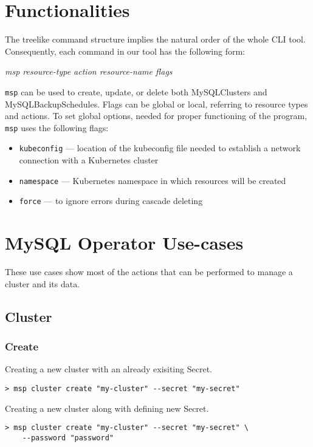 \section{Functionalities}
The treelike command structure implies the natural order of the whole CLI
tool. Consequently, each command in our tool has the following form: \\
\centerline{\textit{msp resource-type action resource-name flags}}
\texttt{msp} can be used to create, update, or delete both MySQLClusters
and MySQLBackupSchedules. Flags can be global or local, referring
to resource types and actions. To set global options, needed for proper
functioning of the program, \texttt{msp} uses the following flags:
\begin{itemize}
    \item \texttt{kubeconfig} --- location of the kubeconfig file needed to
        establish a network connection with a Kubernetes cluster
    \item \texttt{namespace} --- Kubernetes namespace in which resources will be created
    \item \texttt{force} --- to ignore errors during cascade deleting
\end{itemize}


\section{MySQL Operator Use-cases}

These use cases show most of the actions that can be performed to manage a cluster and its data.

\subsection{Cluster}

\subsubsection*{Create}
\noindent Creating a new cluster with an already exisiting Secret.

\begin{lstlisting}
> msp cluster create "my-cluster" --secret "my-secret"
\end{lstlisting}

\noindent Creating a new cluster along with defining new Secret.

\begin{lstlisting}
> msp cluster create "my-cluster" --secret "my-secret" \
	--password "password"
\end{lstlisting}

